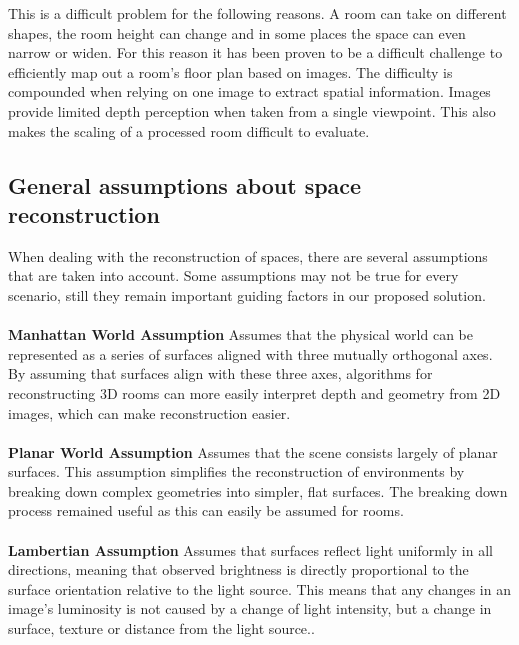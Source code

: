 This is a difficult problem for the following reasons. A room can take on different shapes, the room height can change and in some places the space can even narrow or widen. For this reason it has been proven to be a difficult challenge to efficiently map out a room's floor plan based on images. The difficulty is compounded when relying on one image to extract spatial information. Images provide limited depth perception when taken from a single viewpoint. This also makes the scaling of a processed room difficult to evaluate.

\subsection{General assumptions about space reconstruction}
When dealing with the reconstruction of spaces, there are several assumptions that are taken into account. Some assumptions may not be true for every scenario, still they remain important guiding factors in our proposed solution.
\paragraph{}

\textbf{Manhattan World Assumption} Assumes that the physical world can be represented as a series of surfaces aligned with three mutually orthogonal axes. By assuming that surfaces align with these three axes, algorithms for reconstructing 3D rooms can more easily interpret depth and geometry from 2D images, which can make reconstruction easier.

\paragraph{}

\textbf{Planar World Assumption} Assumes that the scene consists largely of planar surfaces. This assumption simplifies the reconstruction of environments by breaking down complex geometries into simpler, flat surfaces. The breaking down process remained useful as this can easily be assumed for rooms. 

\paragraph{}

\textbf{Lambertian Assumption} Assumes that surfaces reflect light uniformly in all directions, meaning that observed brightness is directly proportional to the surface orientation relative to the light source. This means that any changes in an image's luminosity is not caused by a change of light intensity, but a change in surface, texture or distance from the light source..
